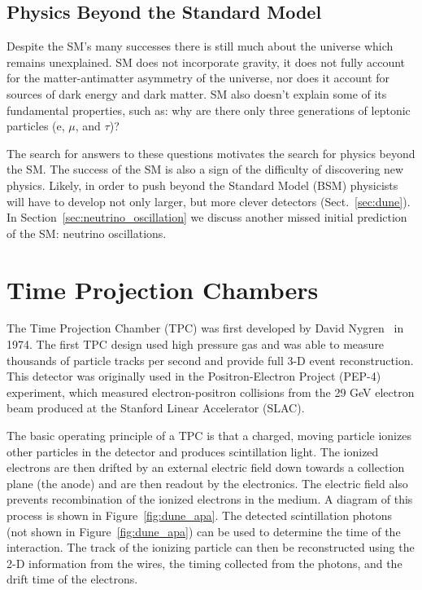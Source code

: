 \subsection{Physics Beyond the Standard Model}
Despite the SM's many successes there is still much about the universe which remains unexplained.
SM does not incorporate gravity, it does not fully account for the matter-antimatter asymmetry of the universe, nor does it account for sources of dark energy and dark matter.
SM also doesn't explain some of its fundamental properties, such as: why are there only three generations of leptonic particles (e, $\mu$, and $\tau$)?

The search for answers to these questions motivates the search for physics beyond the SM.
The success of the SM is also a sign of the difficulty of discovering new physics.
Likely, in order to push beyond the Standard Model (BSM) physicists will have to develop not only larger, but more clever detectors (Sect.~\ref{sec:dune}).
In Section~\ref{sec:neutrino_oscillation} we discuss another missed initial prediction of the SM: neutrino oscillations. 

\section{Time Projection Chambers}
\label{sec:tpcs}
The Time Projection Chamber (TPC) was first developed by David Nygren~\cite{lartpc:nygren} in 1974.
The first TPC design used high pressure gas and was able to measure thousands of particle tracks per second and provide full 3-D event reconstruction.
This detector was originally used in the Positron-Electron Project (PEP-4) experiment, which measured electron-positron collisions from the 29 GeV electron beam produced at the Stanford Linear Accelerator (SLAC).

The basic operating principle of a TPC is that a charged, moving particle ionizes other particles in the detector and produces scintillation light.
The ionized electrons are then drifted by an external electric field down towards a collection plane (the anode) and are then readout by the electronics.
The electric field also prevents recombination of the ionized electrons in the medium. 
A diagram of this process is shown in Figure~\ref{fig:dune_apa}.
The detected scintillation photons (not shown in Figure~\ref{fig:dune_apa}) can be used to determine the time of the interaction.
The track of the ionizing particle can then be reconstructed using the 2-D information from the wires, the timing collected from the photons, and the drift time of the electrons.

